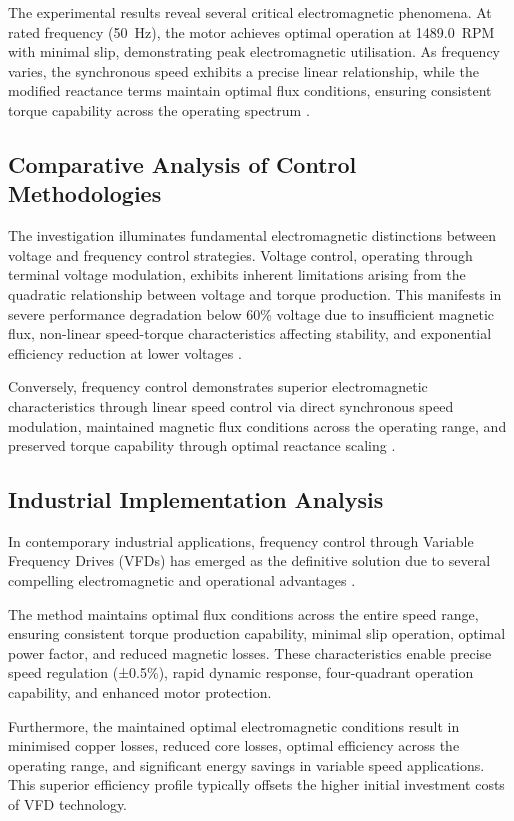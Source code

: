 \documentclass[a4paper,12pt]{article}
\begin{document}
The experimental results reveal several critical electromagnetic phenomena. At rated frequency (50~Hz), the motor achieves optimal operation at 1489.0~RPM with minimal slip, demonstrating peak electromagnetic utilisation. As frequency varies, the synchronous speed exhibits a precise linear relationship, while the modified reactance terms maintain optimal flux conditions, ensuring consistent torque capability across the operating spectrum \cite{Boldea2014}.

\subsection*{Comparative Analysis of Control Methodologies}

The investigation illuminates fundamental electromagnetic distinctions between voltage and frequency control strategies. Voltage control, operating through terminal voltage modulation, exhibits inherent limitations arising from the quadratic relationship between voltage and torque production. This manifests in severe performance degradation below 60\% voltage due to insufficient magnetic flux, non-linear speed-torque characteristics affecting stability, and exponential efficiency reduction at lower voltages \cite{fitzgerald2020}.

Conversely, frequency control demonstrates superior electromagnetic characteristics through linear speed control via direct synchronous speed modulation, maintained magnetic flux conditions across the operating range, and preserved torque capability through optimal reactance scaling \cite{mohan2014}.

\subsection*{Industrial Implementation Analysis}

In contemporary industrial applications, frequency control through Variable Frequency Drives (VFDs) has emerged as the definitive solution due to several compelling electromagnetic and operational advantages \cite{sen2021}.

The method maintains optimal flux conditions across the entire speed range, ensuring consistent torque production capability, minimal slip operation, optimal power factor, and reduced magnetic losses. These characteristics enable precise speed regulation (±0.5\%), rapid dynamic response, four-quadrant operation capability, and enhanced motor protection.

Furthermore, the maintained optimal electromagnetic conditions result in minimised copper losses, reduced core losses, optimal efficiency across the operating range, and significant energy savings in variable speed applications. This superior efficiency profile typically offsets the higher initial investment costs of VFD technology.
\end{document}

